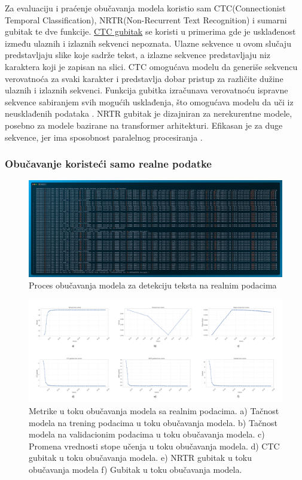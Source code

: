 \documentclass[a4paper,12pt]{article}
\begin{document}
	Za evaluaciju i praćenje obučavanja modela koristio sam CTC(Connectionist Temporal Classification), NRTR(Non-Recurrent Text Recognition) i sumarni gubitak te dve funkcije. \href{https://paperswithcode.com/method/ctc-loss}{CTC gubitak} se koristi u primerima gde je usklađenost između ulaznih i izlaznih sekvenci nepoznata. Ulazne sekvence u ovom slučaju predstavljaju slike koje sadrže tekst, a izlazne sekvence predstavljaju niz karaktera koji je zapisan na slici. CTC omogućava modelu da generiše sekvencu verovatnoća za svaki karakter i predstavlja dobar pristup za različite dužine ulaznih i izlaznih sekvenci. Funkcija gubitka izračunava verovatnoću ispravne sekvence sabiranjem svih mogućih usklađenja, što omogućava modelu da uči iz neusklađenih podataka \cite{inproceedings}. NRTR gubitak je dizajniran za nerekurentne modele, posebno za modele bazirane na transformer arhitekturi. Efikasan je za duge sekvence, jer ima sposobnost paralelnog procesiranja \cite{hu2020gtcguidedtrainingctc}.
	
	\subsubsection{Obučavanje koristeći samo realne podatke}
	\begin{figure}[H]
		\centering
		\includegraphics[width=\textwidth]{assets/train-code-real-data.png}
		\caption{Proces obučavanja modela za detekciju teksta na realnim podacima}
		\label{fig:train-code-real-data}
	\end{figure}

	\begin{figure}[H]
		\centering
		\includegraphics[width=\textwidth]{assets/real-data-metrics.png}
		\caption{Metrike u toku obučavanja modela sa realnim podacima. a) Tačnost modela na trening podacima u toku obučavanja modela. b) Tačnost modela na validacionim podacima u toku obučavanja modela. c) Promena vrednosti stope učenja u toku obučavanja modela. d) CTC gubitak u toku obučavanja modela. e) NRTR gubitak u toku obučavanja modela f) Gubitak u toku obučavanja modela.}
		\label{fig:real-data-metrics}
	\end{figure}
	
\end{document}
